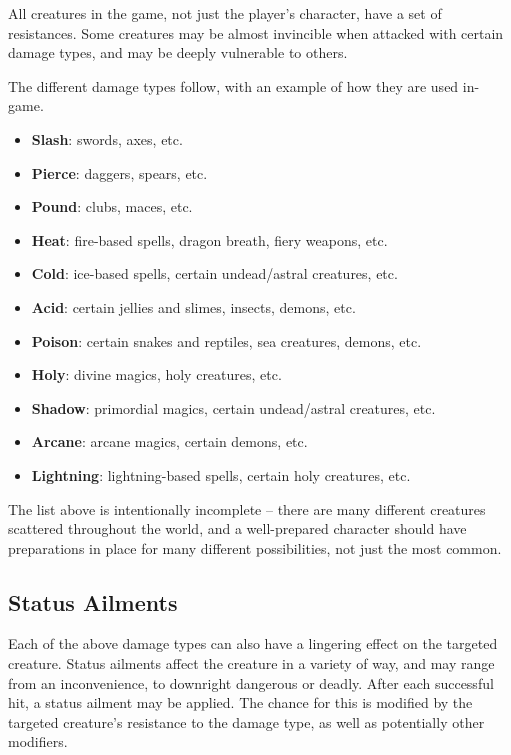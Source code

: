 All creatures in the game, not just the player's character, have a set of 
resistances.  Some creatures may be almost invincible when attacked with
certain damage types, and may be deeply vulnerable to others.

The different damage types follow, with an example of how they are used
in-game.

\begin{itemize}
\item {\bf Slash}: swords, axes, etc.
\item {\bf Pierce}: daggers, spears, etc.
\item {\bf Pound}: clubs, maces, etc.
\item {\bf Heat}: fire-based spells, dragon breath, fiery weapons, etc.
\item {\bf Cold}: ice-based spells, certain undead/astral creatures, etc.
\item {\bf Acid}: certain jellies and slimes, insects, demons, etc.
\item {\bf Poison}: certain snakes and reptiles, sea creatures, demons, etc.
\item {\bf Holy}: divine magics, holy creatures, etc.
\item {\bf Shadow}: primordial magics, certain undead/astral creatures, etc.
\item {\bf Arcane}: arcane magics, certain demons, etc.
\item {\bf Lightning}: lightning-based spells, certain holy creatures, etc.
\end{itemize}

The list above is intentionally incomplete -- there are many different
creatures scattered throughout the world, and a well-prepared character 
should have preparations in place for many different possibilities, not 
just the most common.

\subsection{Status Ailments}

Each of the above damage types can also have a lingering effect on the
targeted creature.  Status ailments affect the creature in a variety of
way, and may range from an inconvenience, to downright dangerous or
deadly.  After each successful hit, a status ailment may be applied.  The
chance for this is modified by the targeted creature's resistance to the
damage type, as well as potentially other modifiers.

